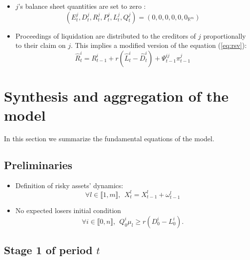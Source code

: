 \documentclass{article}
\newcommand{\wh}{\widehat}
\begin{document}
\begin{enumerate}
\begin{itemize}
        \item $j$'s balance sheet quantities are set to zero :
        $$(E_t^j, D_t^j, R_t^j, P_t^j, L_t^j, Q_t^j) = (0, 0, 0, 0, 0, 0_{\mathbb{R}^m}) $$
        
        \item Proceedings of liquidation are distributed to the creditors of $j$ proportionally to their claim on $j$. This implies a modified version of the equation (\ref{eq:rsv}): 
        $$ \widehat{R}_t^i = R_{t-1}^i + r (\wh L_t^i - \wh D_t^i)+ \Psi_{t-1}^{ij} \pi_{t-1}^j$$


    \end{itemize}

 \end{enumerate}
 

\section{Synthesis and aggregation of the model}

In this section we summarize the fundamental equations of the model. 

\subsection{Preliminaries}


\begin{itemize}
    \item Definition of risky assets' dynamics:
    $$\forall l \in \llbracket 1, m \rrbracket,~~X_t^l = X_{t-1}^l + \omega_{t-1}^l$$
    \item No expected losers initial condition
    $$\forall i \in \llbracket 0, n \rrbracket,~~Q_0^{i} \mu_l \geq r(D_0^i - L_0^i).$$
\end{itemize}


\subsection{Stage 1 of period $t$}
\end{document}
